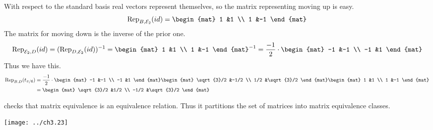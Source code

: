 \documentclass[9pt,t]{beamer}
\begin{document}
\begin{frame}
With respect to the standard basis real vectors represent themselves,
so the matrix representing moving up is easy.
\begin{equation*}
  \rep{id}{B,\stdbasis_2}
  =\begin{mat}
    1 &1 \\
    1 &-1
  \end{mat}
\end{equation*}
The matrix for moving down is the inverse of the prior one.
\begin{equation*}
  \rep{id}{\stdbasis_2,D}
  =(\rep{id}{D,\stdbasis_2})^{-1}
  =
  \begin{mat}
    1 &1 \\
    1 &-1
  \end{mat}^{-1}
  =\frac{-1}{2}\cdot
  \begin{mat}
    -1 &-1 \\
   -1  &1
  \end{mat}
\end{equation*}
Thus we have this.
\begin{align*}
  \rep{t_{\pi/6}}{B,D}
  &=\frac{-1}{2}\cdot
  \begin{mat}
    -1 &-1 \\
   -1  &1
  \end{mat}
  \begin{mat}
    \sqrt{3}/2  &-1/2 \\
    1/2         &\sqrt{3}/2
  \end{mat}
  \begin{mat}
    1 &1 \\
    1 &-1
  \end{mat}                         \\
  &=
  \begin{mat}
    \sqrt{3}/2 &1/2 \\
    -1/2       &\sqrt{3}/2   
  \end{mat}
\end{align*}
\end{frame}




\begin{frame}
\pause
\co[le:MatEqIsSameMap]

\pause
\medskip
{} checks that
matrix equivalence is an equivalence relation.
Thus it  partitions 
the set of matrices into matrix equivalence classes.
\begin{center}
  \texttt{[image: ../ch3.23]}
\end{center}
\end{frame}
\end{document}
